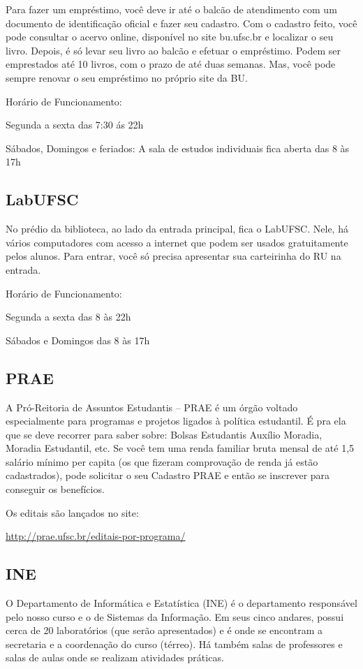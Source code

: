 \documentclass{article}
\begin{document}
Para fazer um empréstimo, você deve ir até o balcão de atendimento com um documento de identificação oficial  e fazer seu cadastro. Com o cadastro feito, você pode consultar o acervo online, disponível no site bu.ufsc.br e localizar o seu livro. Depois, é só levar seu livro ao balcão e efetuar o empréstimo. Podem ser emprestados até 10 livros, com o prazo de até duas semanas. Mas, você pode sempre renovar o seu empréstimo no próprio site da BU.

Horário de Funcionamento:


Segunda a sexta das 7:30 ás 22h

Sábados, Domingos e feriados: A sala de estudos individuais fica aberta das 8 às 17h

\subsection{LabUFSC}
No prédio da biblioteca, ao lado da entrada principal, fica o LabUFSC. Nele, há vários computadores com acesso a internet que podem ser usados gratuitamente pelos alunos. Para entrar, você só precisa apresentar sua carteirinha do RU na entrada.

Horário de Funcionamento:


Segunda a sexta das 8 às 22h

Sábados e Domingos das 8 às 17h

\subsection{PRAE} A Pró-Reitoria de Assuntos Estudantis – PRAE é um órgão voltado especialmente para programas e projetos ligados à política estudantil. É pra ela que se deve recorrer para saber sobre: Bolsas Estudantis  Auxílio Moradia, Moradia Estudantil, etc. Se você tem uma renda familiar bruta mensal de até 1,5 salário mínimo per capita (os que fizeram comprovação de renda já estão cadastrados), pode solicitar o seu Cadastro PRAE e então se inscrever para conseguir os benefícios. 

Os editais são lançados no site:

\url{http://prae.ufsc.br/editais-por-programa/}

\subsection{INE}
O Departamento de Informática e Estatística (INE) é o departamento responsável pelo nosso curso e o de Sistemas da Informação. Em seus cinco andares, possui cerca de 20 laboratórios (que serão apresentados) e é onde se encontram a secretaria e a coordenação do curso (térreo). Há também salas de professores e salas de aulas onde se realizam atividades práticas.
\end{document}
